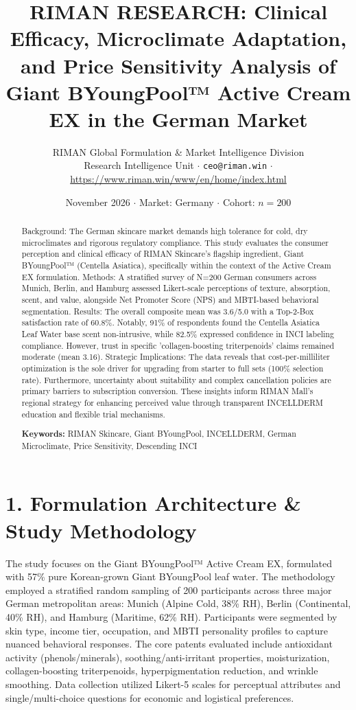 \documentclass[10pt,twocolumn,a4paper]{article}
\title{\textbf{RIMAN RESEARCH: Clinical Efficacy, Microclimate Adaptation, and Price Sensitivity Analysis of Giant BYoungPool™ Active Cream EX in the German Market}}
\author{RIMAN Global Formulation \& Market Intelligence Division\\
\small Research Intelligence Unit $\cdot$ \texttt{ceo@riman.win} $\cdot$ \url{https://www.riman.win/www/en/home/index.html}}
\date{November 2026 \quad $\cdot$ \quad Market: Germany \quad $\cdot$ \quad Cohort: $n = 200$}
\begin{document}
\maketitle

\begin{abstract}
Background: The German skincare market demands high tolerance for cold, dry microclimates and rigorous regulatory compliance. This study evaluates the consumer perception and clinical efficacy of RIMAN Skincare’s flagship ingredient, Giant BYoungPool™ (Centella Asiatica), specifically within the context of the Active Cream EX formulation. Methods: A stratified survey of N=200 German consumers across Munich, Berlin, and Hamburg assessed Likert-scale perceptions of texture, absorption, scent, and value, alongside Net Promoter Score (NPS) and MBTI-based behavioral segmentation. Results: The overall composite mean was 3.6/5.0 with a Top-2-Box satisfaction rate of 60.8\%. Notably, 91\% of respondents found the Centella Asiatica Leaf Water base scent non-intrusive, while 82.5\% expressed confidence in INCI labeling compliance. However, trust in specific 'collagen-boosting triterpenoids' claims remained moderate (mean 3.16). Strategic Implications: The data reveals that cost-per-milliliter optimization is the sole driver for upgrading from starter to full sets (100\% selection rate). Furthermore, uncertainty about suitability and complex cancellation policies are primary barriers to subscription conversion. These insights inform RIMAN Mall’s regional strategy for enhancing perceived value through transparent INCELLDERM education and flexible trial mechanisms.

\vspace{0.4em}
\noindent\textbf{Keywords:} RIMAN Skincare, Giant BYoungPool, INCELLDERM, German Microclimate, Price Sensitivity, Descending INCI
\end{abstract}

\section{1. Formulation Architecture \& Study Methodology}
The study focuses on the Giant BYoungPool™ Active Cream EX, formulated with 57\% pure Korean-grown Giant BYoungPool leaf water. The methodology employed a stratified random sampling of 200 participants across three major German metropolitan areas: Munich (Alpine Cold, 38\% RH), Berlin (Continental, 40\% RH), and Hamburg (Maritime, 62\% RH). Participants were segmented by skin type, income tier, occupation, and MBTI personality profiles to capture nuanced behavioral responses. The core patents evaluated include antioxidant activity (phenols/minerals), soothing/anti-irritant properties, moisturization, collagen-boosting triterpenoids, hyperpigmentation reduction, and wrinkle smoothing. Data collection utilized Likert-5 scales for perceptual attributes and single/multi-choice questions for economic and logistical preferences.
\end{document}
